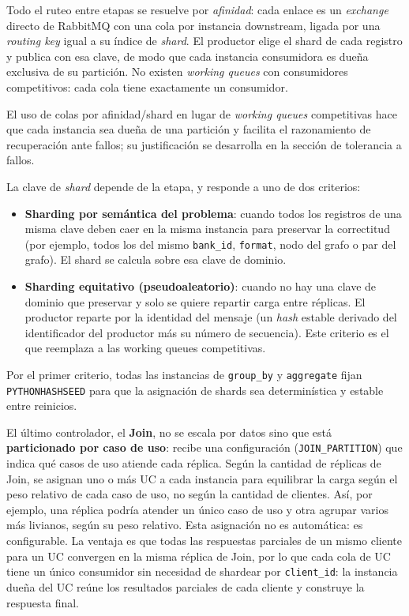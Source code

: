 \documentclass[12pt,a4paper]{article}
\begin{document}
Todo el ruteo entre etapas se resuelve por \textit{afinidad}: cada enlace
es un \textit{exchange} directo de RabbitMQ con una cola por instancia
downstream, ligada por una \textit{routing key} igual a su índice de
\textit{shard}. El productor elige el shard de cada registro y publica con
esa clave, de modo que cada instancia consumidora es dueña exclusiva de
su partición. No existen \textit{working queues} con consumidores
competitivos: cada cola tiene exactamente un consumidor.

El uso de colas por afinidad/shard en lugar de \textit{working queues}
competitivas hace que cada instancia sea dueña de una partición y facilita el
razonamiento de recuperación ante fallos; su justificación se desarrolla en la
sección de tolerancia a fallos.

La clave de \textit{shard} depende de la etapa, y responde a uno de dos
criterios:
\begin{itemize}
    \item \textbf{Sharding por semántica del problema}: cuando todos los
        registros de una misma clave deben caer en la misma instancia para
        preservar la correctitud (por ejemplo, todos los del mismo
        \texttt{bank\_id}, \texttt{format}, nodo del grafo o par del grafo). El
        shard se calcula sobre esa clave de dominio.
    \item \textbf{Sharding equitativo (pseudoaleatorio)}: cuando no hay una
        clave de dominio que preservar y solo se quiere repartir carga entre
        réplicas. El productor reparte por la identidad del mensaje (un
            \textit{hash} estable derivado del identificador del
            productor más su
        número de secuencia). Este criterio es el que reemplaza a las working
        queues competitivas.
\end{itemize}
Por el primer criterio, todas las instancias de \texttt{group\_by} y
\texttt{aggregate} fijan \texttt{PYTHONHASHSEED} para que la
asignación de shards sea determinística y estable entre reinicios.

El último controlador, el \textbf{Join}, no se escala por datos sino que
está \textbf{particionado por caso de uso}: recibe una configuración
(\texttt{JOIN\_PARTITION}) que indica qué casos de uso atiende cada réplica.
Según la cantidad de réplicas de Join, se asignan uno o más UC a cada
instancia para equilibrar la carga según el peso relativo de cada caso de
uso, no según la cantidad de clientes. Así, por ejemplo, una réplica
podría atender un único caso de uso y otra agrupar varios más livianos,
según su peso relativo. Esta asignación no es
automática: es configurable. La ventaja es que todas las respuestas
parciales de un mismo cliente para un UC convergen en la misma réplica de
Join, por lo que cada cola de UC tiene un único consumidor sin necesidad de
shardear por \texttt{client\_id}: la instancia dueña del UC reúne los
resultados parciales de cada cliente y construye la respuesta final.
\end{document}
